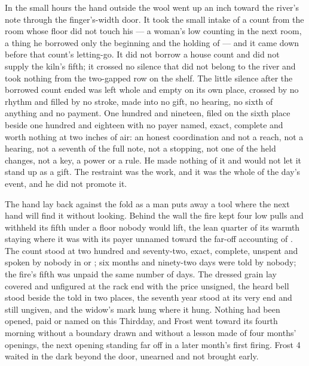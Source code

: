 In the small hours the hand outside the wool went up an inch toward the river's note through the finger's-width door. It took the small intake of a count from the room whose floor did not touch his --- a woman's low counting in the next room, a thing he borrowed only the beginning and the holding of --- and it came down before that count's letting-go. It did not borrow a house count and did not supply the kiln's fifth; it crossed no silence that did not belong to the river and took nothing from the two-gapped row on the shelf. The little silence after the borrowed count ended was left whole and empty on its own place, crossed by no rhythm and filled by no stroke, made into no gift, no hearing, no sixth of anything and no payment. One hundred and nineteen, filed on the sixth place beside one hundred and eighteen with no payer named, exact, complete and worth nothing at two inches of air: an honest coordination and not a reach, not a hearing, not a seventh of the full note, not a stopping, not one of the held changes, not a key, a power or a rule. He made nothing of it and would not let it stand up as a gift. The restraint was the work, and it was the whole of the day's event, and he did not promote it.

The hand lay back against the fold as a man puts away a tool where the next hand will find it without looking. Behind the wall the fire kept four low pulls and withheld its fifth under a floor nobody would lift, the lean quarter of its warmth staying where it was with its payer unnamed toward the far-off accounting of . The count stood at two hundred and seventy-two, exact, complete, unspent and spoken by nobody in  or ; six months and ninety-two days were told by nobody; the fire's fifth was unpaid the same number of days. The dressed grain lay covered and unfigured at the rack end with the price unsigned, the heard bell stood beside the told in two places, the seventh year stood at its very end and still ungiven, and the widow's mark hung where it hung. Nothing had been opened, paid or named on this Thirdday, and Frost went toward its fourth morning without a boundary drawn and without a lesson made of four months' openings, the next opening standing far off in a later month's first firing. Frost 4 waited in the dark beyond the door, unearned and not brought early.
